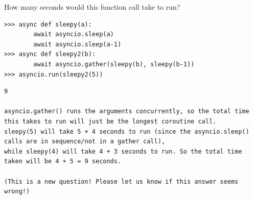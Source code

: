 \question How many seconds would this function call take to run?

\begin{lstlisting}
>>> async def sleepy(a):
        await asyncio.sleep(a)
        await asyncio.sleep(a-1)
>>> async def sleepy2(b):
        await asyncio.gather(sleepy(b), sleepy(b-1))
>>> asyncio.run(sleepy2(5))
\end{lstlisting}

\begin{solution}[1in]
\begin{lstlisting}
9

asyncio.gather() runs the arguments concurrently, so the total time this takes to run will just be the longest coroutine call. 
sleepy(5) will take 5 + 4 seconds to run (since the asyncio.sleep() calls are in sequence/not in a gather call), 
while sleepy(4) will take 4 + 3 seconds to run. So the total time taken will be 4 + 5 = 9 seconds.

(This is a new question! Please let us know if this answer seems wrong!)
\end{lstlisting}
\end{solution}
